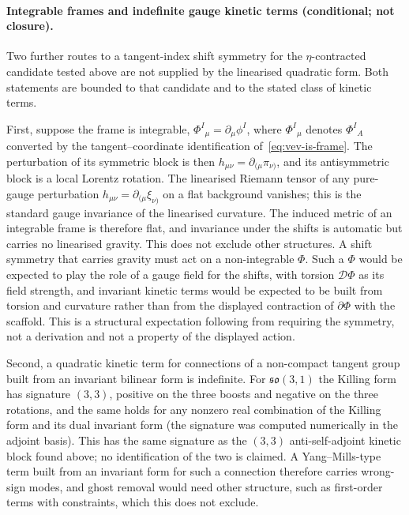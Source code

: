 \paragraph{Integrable frames and indefinite gauge kinetic terms
(conditional; not closure).}
Two further routes to a tangent-index shift symmetry for the
\(\eta\)-contracted candidate tested above are not supplied by the linearised
quadratic form.  Both statements are bounded to that candidate and to the
stated class of kinetic terms.

First, suppose the frame is integrable,
\(\Phi^I{}_\mu=\partial_\mu\phi^I\), where \(\Phi^I{}_\mu\) denotes
\(\Phi^I{}_A\) converted by the tangent--coordinate identification
of~\eqref{eq:vev-is-frame}.  The perturbation of its symmetric block is then
\(h_{\mu\nu}=\partial_{(\mu}\pi_{\nu)}\), and its antisymmetric block is a
local Lorentz rotation.  The linearised Riemann tensor of any pure-gauge
perturbation \(h_{\mu\nu}=\partial_{(\mu}\xi_{\nu)}\) on a flat background
vanishes; this is the standard gauge invariance of the linearised curvature.
The induced metric of an integrable frame is therefore flat, and invariance
under the shifts is automatic but carries no linearised gravity.  This does
not exclude other structures.  A shift symmetry that carries gravity must act
on a non-integrable \(\Phi\).  Such a \(\Phi\) would be expected to play the
role of a gauge field for the shifts, with torsion \(\mathcal{D}\Phi\) as its
field strength, and invariant kinetic terms would be expected to be built from
torsion and curvature rather than from the displayed contraction of
\(\partial\Phi\) with the scaffold.  This is a structural expectation
following from requiring the symmetry, not a derivation and not a property of
the displayed action.

Second, a quadratic kinetic term for connections of a non-compact tangent
group built from an invariant bilinear form is indefinite.  For
\(\mathfrak{so}(3,1)\) the Killing form has signature \((3,3)\), positive on
the three boosts and negative on the three rotations, and the same holds for
any nonzero real combination of the Killing form and its dual invariant form
(the signature was computed numerically in the adjoint basis).  This has the
same signature as the \((3,3)\) anti-self-adjoint kinetic block found above;
no identification of the two is claimed.  A Yang--Mills-type term built from
an invariant form for such a connection therefore carries wrong-sign modes,
and ghost removal would need other structure, such as first-order terms with
constraints, which this does not exclude.

